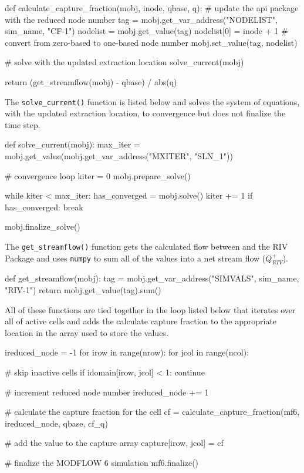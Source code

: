 \begin{python}
def calculate_capture_fraction(mobj, inode, qbase, q):
  # update the api package with the reduced node number
  tag = mobj.get_var_address("NODELIST", sim_name, "CF-1")
  nodelist = mobj.get_value(tag)
  nodelist[0] = inode + 1  # convert from zero-based to one-based node number
  mobj.set_value(tag, nodelist)

  # solve with the updated extraction location
  solve_current(mobj)

  return (get_streamflow(mobj) - qbase) / abs(q)
\end{python}


\noindent The \texttt{solve\_current()} function is listed below and solves the system of equations, with the updated extraction location, to convergence but does not finalize the time step. 

\begin{python}
def solve_current(mobj):
    max_iter = mobj.get_value(mobj.get_var_address("MXITER", "SLN_1"))

    # convergence loop
    kiter = 0
    mobj.prepare_solve()

    while kiter < max_iter:
        has_converged = mobj.solve()
        kiter += 1
        if has_converged:
            break

    mobj.finalize_solve()
\end{python}

\noindent The \texttt{get\_streamflow()} function gets the calculated flow between \MF and the RIV Package and uses \texttt{numpy} to sum all of the values into a net stream flow ($Q_{RIV}^{+}$). 

\begin{python}
def get_streamflow(mobj):
    tag = mobj.get_var_address("SIMVALS", sim_name, "RIV-1")
    return mobj.get_value(tag).sum()
\end{python}

\noindent All of these functions are tied together in the loop listed below that iterates over all of active cells and adds the calculate capture fraction to the appropriate location in the array used to store the values.

\begin{python}
ireduced_node = -1
for irow in range(nrow):
  for jcol in range(ncol):

    # skip inactive cells
    if idomain[irow, jcol] < 1:
        continue

    # increment reduced node number
    ireduced_node += 1

    # calculate the capture fraction for the cell
    cf = calculate_capture_fraction(mf6, ireduced_node, qbase, cf_q)

    # add the value to the capture array
    capture[irow, jcol] = cf

# finalize the MODFLOW 6 simulation
mf6.finalize()
\end{python} 

